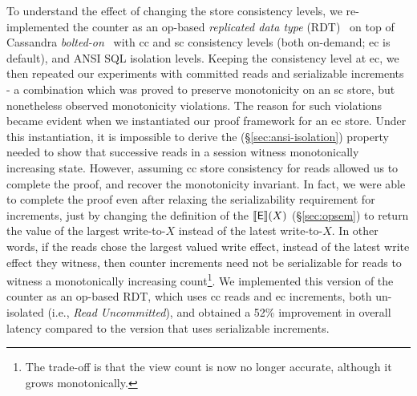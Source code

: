 To understand the effect of changing the store consistency levels, we
re-implemented the counter as an op-based \emph{replicated data type}
(RDT)~\cite{crdt,burckhardt14} on top of Cassandra
\emph{bolted-on}~\cite{bailisbolton} with {\sc cc} and {\sc sc}
consistency levels (both on-demand; {\sc ec} is default), and ANSI SQL
isolation levels. Keeping the consistency level at {\sc ec}, we then
repeated our experiments with committed reads and serializable
increments - a combination which was proved to preserve monotonicity
on an {\sc sc} store, but nonetheless observed monotonicity
violations. The reason for such violations became evident when
we instantiated our proof framework for an {\sc ec} store.
Under this instantiation, it is impossible to derive the
 (\S\ref{sec:ansi-isolation}) property needed to show
that successive reads in a session witness monotonically increasing
state. However, assuming {\sc cc} store consistency for reads allowed
us to complete the proof, and recover the monotonicity invariant. In
fact, we were able to complete the proof even after relaxing the
serializability requirement for increments, just by changing the
definition of the $\llbracket \textsf{E} \rrbracket(X)$ (\S\ref{sec:opsem}) to return the
value of the largest write-to-$X$ instead of the latest write-to-$X$.
In other words, if the reads chose the largest valued write effect,
instead of the latest write effect they witness, then counter
increments need not be serializable for reads to witness a
monotonically increasing count\footnote{The trade-off is that the view
count is now no longer accurate, although it grows monotonically.}.
We implemented this version of the counter as an op-based RDT, which
uses {\sc cc} reads and {\sc ec} increments, both un-isolated (i.e.,
\emph{Read Uncommitted}), and obtained a 52\% improvement in overall
latency compared to the version that uses serializable increments.
\vspace*{-3pt}
